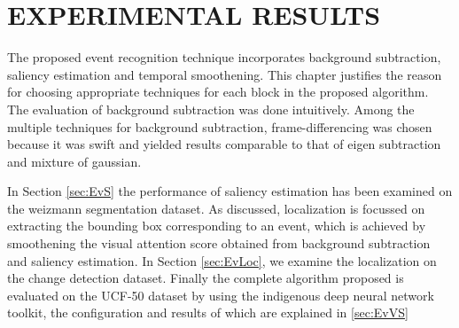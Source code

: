 \chapter{EXPERIMENTAL RESULTS}
\label{chap:exp}
The proposed event recognition technique incorporates background subtraction, saliency estimation and temporal smoothening.  This chapter justifies the reason for choosing appropriate techniques for each block in the proposed algorithm.  The evaluation of background subtraction was done intuitively.  Among the multiple techniques for background subtraction, frame-differencing was chosen because it was swift and yielded results comparable to that of eigen subtraction and mixture of gaussian.
\par In Section \ref{sec:EvS} the performance of saliency estimation has been examined on the weizmann segmentation dataset.  As discussed, localization is focussed on extracting the bounding box corresponding to an event, which is achieved by smoothening the  visual attention score obtained from background subtraction and saliency estimation.  In Section \ref{sec:EvLoc}, we examine the localization on the change detection dataset.  
Finally the complete algorithm proposed is evaluated on the UCF-50 dataset by using the indigenous deep neural network toolkit, the configuration and results of which are explained in \ref{sec:EvVS}

